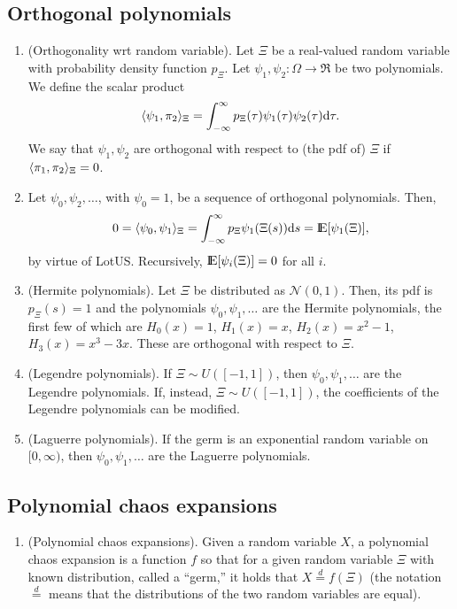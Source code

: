 \documentclass[a4paper,10pt]{article}
\begin{document}
\subsection{Orthogonal polynomials}
\begin{enumerate}
 \item (Orthogonality wrt random variable). Let $\Xi$ be a real-valued random variable with 
       probability density function $p_\Xi$. Let \(\psi_1,\psi_2:\Omega\to\Re\) be two polynomials. 
       We define the scalar product
       \[
        \langle\psi_1, \pi_2\rangle_{\Xi} = \int_{-\infty}^{\infty}p_\Xi(\tau) \psi_1(\tau) \psi_2(\tau) \mathrm{d} \tau.
       \]
       We say that \(\psi_1,\psi_2\) are orthogonal with respect to (the pdf of) \(\Xi\) if 
       \(\langle\pi_1, \pi_2\rangle_{\Xi} = 0\).
 \item Let \(\psi_0, \psi_2,\ldots\), with \(\psi_0=1\), be a sequence of orthogonal polynomials.
       Then,
       \[
        0 = \< \psi_0, \psi_1 \>_\Xi
          = \int_{-\infty}^{\infty} p_{\Xi} \psi_{1}(\Xi(s)) \d s
          = \E[\psi_1(\Xi)],
       \]
       by virtue of LotUS. Recursively, \(\E[\psi_i(\Xi)] = 0\) for all \(i\).
       
 \item (Hermite polynomials). Let \(\Xi\) be distributed as \(\mathcal{N}(0,1)\).
       Then, its pdf is \(p_{\Xi}(s) = 1\) and the polynomials \(\psi_0,\psi_1,\ldots\) are the 
       Hermite polynomials, the first few of which are \(H_0(x)=1\), \(H_1(x)=x\), \(H_2(x)=x^2-1\),
       \(H_3(x) = x^3 - 3x\). These are orthogonal with respect to \(\Xi\).
       
 \item (Legendre polynomials). If \(\Xi\sim U([-1,1])\), then \(\psi_0,\psi_1,\ldots\) are the 
        Legendre polynomials. If, instead, \(\Xi\sim U([-1,1])\), the coefficients of the 
        Legendre polynomials can be modified.
        
 \item (Laguerre polynomials). If the germ is an exponential random variable on \([0,\infty)\),
       then \(\psi_0,\psi_1,\ldots\) are the Laguerre polynomials.
\end{enumerate}

\subsection{Polynomial chaos expansions}
\begin{enumerate}
 \item (Polynomial chaos expansions). Given a random variable \(X\), a polynomial chaos expansion 
       is a function \(f\) so that for a given random variable \(\Xi\) with known distribution, 
       called a ``germ,'' it holds that \(X \overset{d}{=} f(\Xi)\) (the notation \(\overset{d}{=}\)
       means that the distributions of the two random variables are equal).
\end{enumerate}
\end{document}
